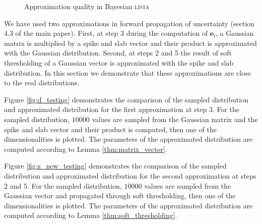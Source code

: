 \documentclass{article}
\begin{document}
\begin{figure}[h]
\centering
{}
\caption{Approximation quality in Bayesian \textsc{lista}}
\end{figure}

We have used two approximations in forward propagation of uncertainty (section 4.3 of the main paper). First, at step 3 during the computation of $\mathbf{e}_l$, a Gaussian matrix is multiplied by a spike and slab vector and their product is approximated with the Gaussian distribution. Second, at steps 2 and 5 the result of soft thresholding of a Gaussian vector is approximated with the spike and slab distribution. In this section we demonstrate that these approximations are close to the real distributions.

Figure \ref{fig:d_testing} demonstrates the comparison of the sampled distribution and approximated distribution for the first approximation at step 3. For the sampled distribution, $10000$ values are sampled from the Gaussian matrix and the spike and slab vector and their product is computed, then one of the dimensionalities is plotted. The parameters of the approximated distribution are computed according to Lemma \ref{thm:matrix_vector}.

Figure \ref{fig:z_new_testing} demonstrates the comparison of the sampled distribution and approximated distribution for the second approximation at steps 2 and 5. For the sampled distribution, $10000$ values are sampled from the Gaussian vector and propagated through soft thresholding, then one of the dimensionalities is plotted. The parameters of the approximated distribution are computed according to Lemma \ref{thm:soft_thresholding}.
\end{document}

